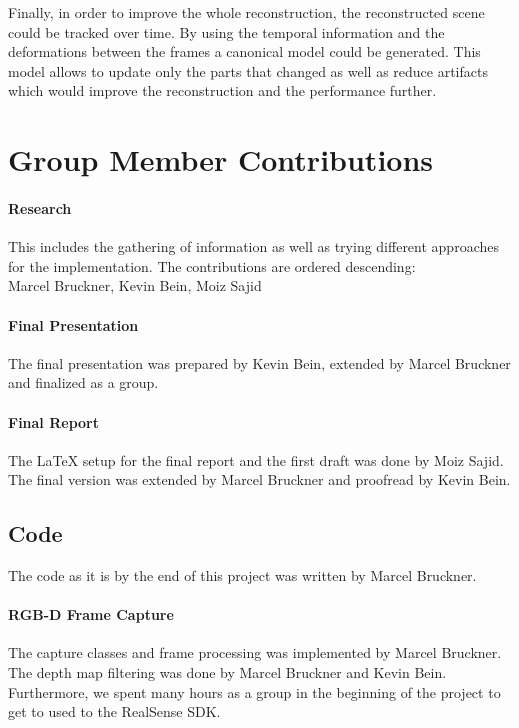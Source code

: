 \documentclass[10pt,twocolumn,letterpaper]{article}
\begin{document}
Finally, in order to improve the whole reconstruction, the reconstructed scene could be tracked over time. By using the temporal information and the deformations between the frames a canonical model could be generated. This model allows to update only the parts that changed as well as reduce artifacts which would improve the reconstruction and the performance further.

\section{Group Member Contributions}
\paragraph{Research}
This includes the gathering of information as well as trying different approaches for the implementation. The contributions are ordered descending:\\
Marcel Bruckner, Kevin Bein, Moiz Sajid

\paragraph{Final Presentation}
The final presentation was prepared by Kevin Bein, extended by Marcel Bruckner and finalized as a group.

\paragraph{Final Report}
The \LaTeX{} setup for the final report and the first draft was done by Moiz Sajid. The final version was extended by Marcel Bruckner and proofread by Kevin Bein.

\subsection{Code}
The code as it is by the end of this project was written by Marcel Bruckner.
\paragraph{RGB-D Frame Capture}
The capture classes and frame processing was implemented by Marcel Bruckner.\\
The depth map filtering was done by Marcel Bruckner and Kevin Bein.\\
Furthermore, we spent many hours as a group in the beginning of the project to get to used to the RealSense SDK. 
\end{document}
